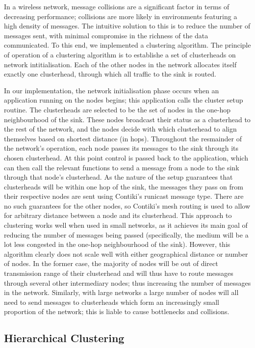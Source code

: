 In a wireless network, message collisions are a significant factor in terms of decreasing performance; collisions are more likely in environments featuring a high density of messages. The intuitive solution to this is to reduce the number of messages sent, with minimal compromise in the richness of the data communicated. To this end, we implemented a clustering algorithm. The principle of operation of a clustering algorithm is to establishe a set of clusterheads on network intitialisation. Each of the other nodes in the network allocates itself exactly one clusterhead, through which all traffic to the sink is routed.

In our implementation, the network initialisation phase occurs when an application running on the nodes begins; this application calls the cluster setup routine. The clusterheads are selected to be the set of nodes in the one-hop neighbourhood of the sink. These nodes broadcast their status as a clusterhead to the rest of the network, and the nodes decide with which clusterhead to align themselves based on shortest distance (in hops). Throughout the resmainder of the network's operation, each node passes its messages to the sink through its chosen clusterhead. At this point control is passed back to the application, which can then call the relevant functions to send a message from a node to the sink through that node's clusterhead. As the nature of the setup guarantees that clusterheads will be within one hop of the sink, the messages they pass on from their respective nodes are sent using Contiki's runicast message type. There are no such guarantees for the other nodes, so Contiki's mesh routing is used to allow for arbitrary distance between a node and its clusterhead. This approach to clustering works well when used in small networks, as it achieves its main goal of reducing the number of messages being passed (specifically, the medium will be a lot less congested in the one-hop neighbourhood of the sink). However, this algorithm clearly does not scale well with either geographical distance or number of nodes. In the former case, the majority of nodes will be out of direct transmission range of their clusterhead and will thus have to route messages through several other intermediary nodes; thus increasing the number of messages in the network. Similarly, with large networks a large number of nodes will all need to send messages to clusterheads which form an increasingly small proportion of the network; this is liable to cause bottlenecks and collisions.

\subsection{Hierarchical Clustering}

